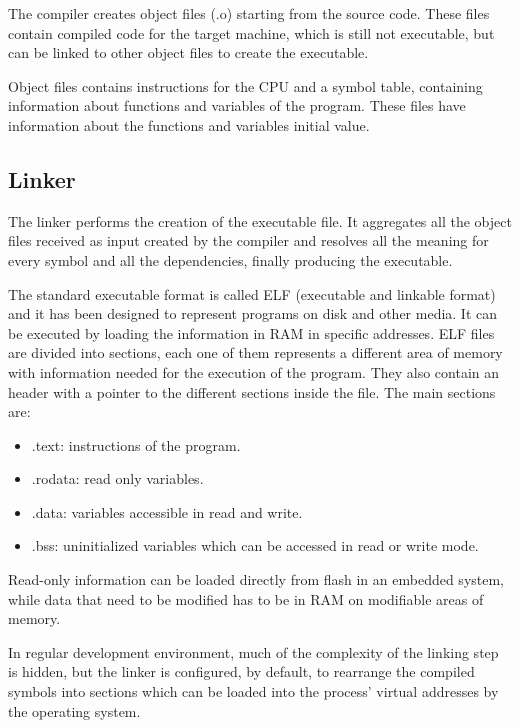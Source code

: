 The compiler creates object files (.o) starting from the source code.
These files contain compiled code for the target machine, which is still not
executable, but can be linked to other object files to create the executable.

Object files contains instructions for the CPU and a symbol table, containing
information about functions and variables of the program.
These files have information about the functions and variables initial value.

\subsection{Linker}

The linker performs the creation of the executable file. It aggregates all the
object files received as input created by the compiler and resolves all the
meaning for every symbol and all the dependencies, finally producing the
executable.

The standard executable format is called ELF (executable and linkable format)
and it has been designed to represent programs on disk and other media.
It can be executed by loading the information in RAM in specific addresses.
ELF files are divided into sections, each one of them represents a different
area of memory with information needed for the execution of the program.
They also contain an header with a pointer to the different sections inside
the file.
The main sections are:

\begin{itemize}
    \item .text: instructions of the program.
    \item .rodata: read only variables.
    \item .data: variables accessible in read and write.
    \item .bss: uninitialized variables which can be accessed in read or write
                mode.
\end{itemize}

Read-only information can be loaded directly from flash in an embedded system,
while data that need to be modified has to be in RAM on modifiable areas of
memory.

In regular development environment, much of the complexity of the linking 
step is hidden, but the linker is configured, by default, to rearrange the
compiled symbols into sections which can be loaded into the process' virtual
addresses by the operating system.

